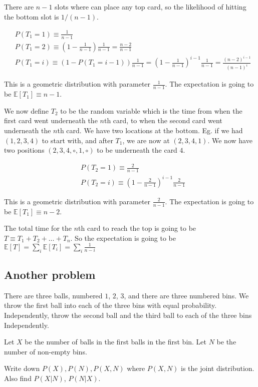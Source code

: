 \documentclass[11pt]{book}
\newcommand{\E}[1]{\ensuremath{\mathbb{E} \left[ #1 \right]}}
\begin{document}
There are $n-1$ slots where can place any top card, so the likelihood of
hitting the bottom slot is $1/(n-1)$.

\begin{align*}
&P(T_1=1) \equiv \frac{1}{n - 1} \\
&P(T_1=2) \equiv \left(1 - \frac{1}{n-1}\right) \frac{1}{n-1} = \frac{n-2}{n-1} \\
&P(T_1=i) \equiv \left(1 - P(T_1=i-1) \right) \frac{1}{n-1} = 
    \left( 1 - \frac{1}{n-1} \right)^{i-1} \frac{1}{n-1} = \frac{(n-2)^{i-1}}{(n-1)^i}
\end{align*}

This is a geometric distribution with parameter $\frac{1}{n-1}$. The expectation
is going to be $\E{T_1} \equiv n-1$.

We now define $T_2$ to be the random variable which is the time from when the
first card went underneath the $n$th card, to when the second card went
underneath the $n$th card. We have two locations at the bottom. Eg. if we had
$(1, 2, 3, 4)$ to start with, and after $T_1$, we are now at $(2, 3, 4, 1)$. We
now have two positions $(2, 3, 4, \circ, 1, \circ)$ to be underneath the card
$4$.

\begin{align*}
&P(T_2=1) \equiv \frac{2}{n - 1} \\
&P(T_2=i) \equiv \left( 1 - \frac{2}{n-1} \right)^{i-1} \frac{2}{n-1}
\end{align*}

This is a geometric distribution with parameter $\frac{2}{n-1}$. The expectation
is going to be $\E{T_1} \equiv n-2$.



The total time for the $n$th card to reach the top is going to be 
$T \equiv T_1 + T_2 + \dots + T_n$. So the expectation is going to be
$\E{T} = \sum_i \E{T_i} = \sum_i \frac{1}{n-i}$

\subsection{Another problem}
There are three balls, numbered $1$, $2$, $3$, and there are three numbered
bins. We throw the first ball into each of the three bins with equal probability.
Independently, throw the second ball and the third ball to each of the three
bins Independently.

Let $X$ be the number of balls in the first balls in the first bin. Let $N$ be
the number of non-empty bins.

Write down $P(X), P(N), P(X, N)$ where $P(X, N)$ is the joint distribution. 
Also find $P(X|N)$, $P(N|X)$.
\end{document}
